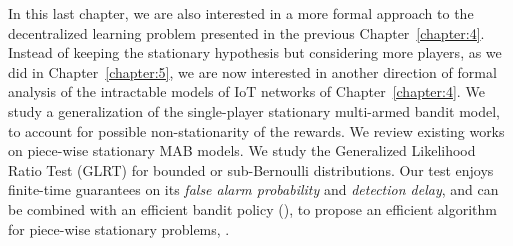 \abstractStartChapter{}%
%
In this last chapter, we are also interested in a more formal approach to the decentralized learning problem presented in the previous Chapter~\ref{chapter:4}.
Instead of keeping the stationary hypothesis but considering more players, as we did in Chapter~\ref{chapter:5}, we are now interested in another direction of formal analysis of the intractable models of IoT networks of Chapter~\ref{chapter:4}.
%
We study a generalization of the single-player stationary multi-armed bandit model,
to account for possible non-stationarity of the rewards.
%
We review existing works on piece-wise stationary MAB models.
%
We study the Generalized Likelihood Ratio Test (GLRT) for
bounded or sub-Bernoulli distributions.
Our test enjoys finite-time guarantees
%
on its \emph{false alarm probability} and \emph{detection delay}, and can be combined with an efficient bandit policy (\klUCB), to propose an efficient algorithm for piece-wise stationary problems, \GLRklUCB.
